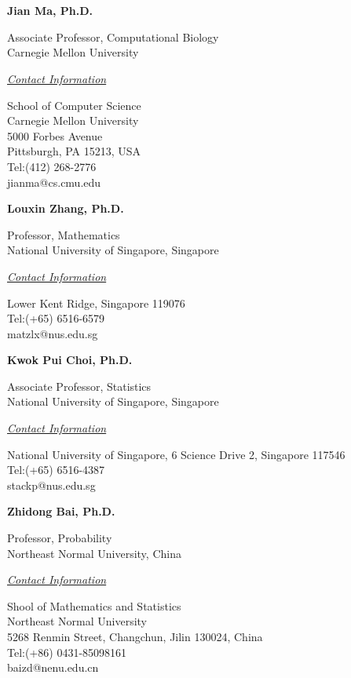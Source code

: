 \documentclass[paper=letter,fontsize=11pt]{scrartcl} %
\newcommand{\sepspace}{\vspace*{1em}}		%
\newcommand{\NewPart}[2]{\section*{\capitalisewords{#1} #2}}
\newcommand{\ReferenceEntry}[3]{
        \noindent \textbf{#1} \par 
        \noindent #2 \par
        \noindent \underline{\textit{Contact Information}} \par
        \noindent #3 \par }
\begin{document}
\NewPart{References}{}
\ReferenceEntry{Jian Ma, Ph.D.}{Associate Professor, Computational Biology\\Carnegie Mellon University}{School of Computer Science\\ Carnegie Mellon University\\ 5000 Forbes Avenue \\Pittsburgh, PA 15213, USA\\Tel:(412) 268-2776\\jianma@cs.cmu.edu}
\sepspace
\ReferenceEntry{Louxin Zhang, Ph.D.}{Professor, Mathematics\\ National University of Singapore, Singapore}{10 Lower Kent Ridge, Singapore 119076\\Tel:(+65) 6516-6579\\matzlx@nus.edu.sg}
\sepspace
\ReferenceEntry{Kwok Pui Choi, Ph.D.}{Associate Professor, Statistics\\ National University of Singapore, Singapore}{National University of Singapore, 6 Science Drive 2, Singapore 117546\\Tel:(+65) 6516-4387\\stackp@nus.edu.sg}
\sepspace
\ReferenceEntry{Zhidong Bai, Ph.D.}{Professor, Probability\\ Northeast Normal University, China}{Shool of Mathematics and Statistics\\Northeast Normal University \\5268 Renmin Street, Changchun, Jilin 130024, China\\Tel:(+86) 0431-85098161\\baizd@nenu.edu.cn}
\end{document}
